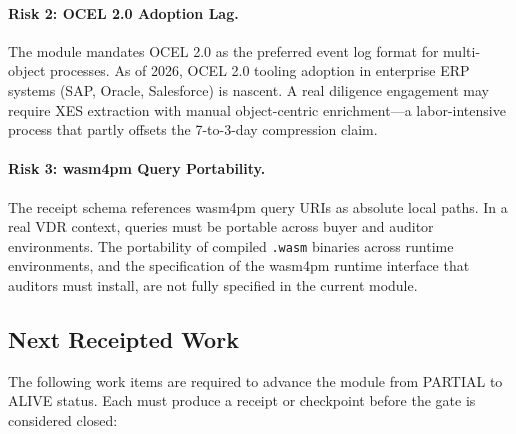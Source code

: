 \paragraph{Risk 2: OCEL 2.0 Adoption Lag.}
The module mandates OCEL 2.0 as the preferred event log format for multi-object processes.
As of 2026, OCEL 2.0 tooling adoption in enterprise ERP systems (SAP, Oracle, Salesforce) is
nascent. A real diligence engagement may require XES extraction with manual object-centric
enrichment---a labor-intensive process that partly offsets the 7-to-3-day compression claim.

\paragraph{Risk 3: wasm4pm Query Portability.}
The receipt schema references wasm4pm query URIs as absolute local paths. In a real VDR
context, queries must be portable across buyer and auditor environments. The portability of
compiled \texttt{.wasm} binaries across runtime environments, and the specification of
the wasm4pm runtime interface that auditors must install, are not fully specified in the
current module.

\subsection{Next Receipted Work}
\label{sec:ma-gaps-next}

The following work items are required to advance the module from PARTIAL to ALIVE status.
Each must produce a receipt or checkpoint before the gate is considered closed:

